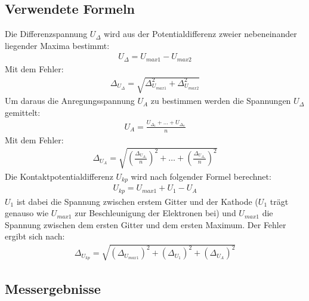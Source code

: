\documentclass[12pt,a4paper]{article}
\begin{document}
\subsection{Verwendete Formeln}
Die Differenzspannung $U_{\Delta}$ wird aus der Potentialdifferenz zweier nebeneinander liegender Maxima bestimmt:
\begin{align}
U_{\Delta} = U_{max1}-U_{max2}
\label{eqn:u_d}
\end{align}
Mit dem Fehler:
\begin{align}
\Delta_{U_{\Delta}} = \sqrt{\Delta_{U_{max1}}^2+\Delta_{U_{max2}}^2}
\label{eqn:u_d_delta}
\end{align}
Um daraus die Anregungsspannung $U_A$ zu bestimmen werden die Spannungen $U_{\Delta}$ gemittelt:
\begin{align}
U_A = \frac{U_{\Delta_1}+\ldots+U_{\Delta_n}}{n}
\label{eqn:u_a}
\end{align}
Mit dem Fehler:
\begin{align}
\Delta_{U_A} = \sqrt{
\left(\frac{\Delta_{U_{\Delta_1}}}{n}\right)^2+
\ldots+
\left(\frac{\Delta_{U_{\Delta_n}}}{n}\right)^2}
\label{eqn:u_a_delta}
\end{align}
Die Kontaktpotentialdifferenz $U_{kp}$ wird nach folgender Formel berechnet:
\begin{align}
U_{kp} = U_{max1} + U_1 - U_A
\label{eqn:kp}
\end{align}
$U_1$ ist dabei die Spannung zwischen erstem Gitter und der Kathode ($U_1$ trägt genauso wie $U_{max1}$ zur Beschleunigung der Elektronen bei) und $U_{max1}$ die Spannung zwischen dem ersten Gitter und dem ersten Maximum.
Der Fehler ergibt sich nach:
\begin{align}
\Delta_{U_{kp}} = \sqrt{
\left(\Delta_{U_{max1}}\right)^2+
\left(\Delta_{U_1}\right)^2+
\left(\Delta_{U_A}\right)^2}
\label{eqn:kp_delta}
\end{align}

\subsection{Messergebnisse}
\end{document}
